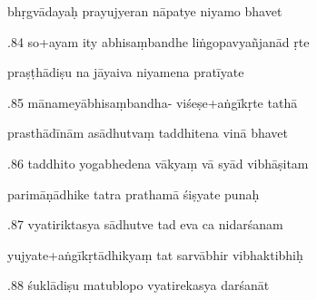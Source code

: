 \documentclass[article,12pt,a4paper]{memoir}%
\newcounter{parCount}
\begin{document}
	  
	  \pstart \leavevmode%
	bhṛgvādayaḥ prayujyeran nāpatye niyamo bhavet 
	{}
	\pend%
      

	  
	  \pstart {}.84 so+ayam ity abhisaṃbandhe liṅgopavyañjanād ṛte 
	{}
	\pend%
      

	  
	  \pstart \leavevmode%
	praṣṭhādiṣu na jāyaiva niyamena pratīyate 
	{}
	\pend%
      

	  
	  \pstart {}.85 mānameyābhisaṃbandha- viśeṣe+aṅgīkṛte tathā 
	{}
	\pend%
      

	  
	  \pstart \leavevmode%
	prasthādīnām asādhutvaṃ taddhitena vinā bhavet 
	{}
	\pend%
      

	  
	  \pstart {}.86 taddhito yogabhedena vākyaṃ vā syād vibhāṣitam 
	{}
	\pend%
      

	  
	  \pstart \leavevmode%
	parimāṇādhike tatra prathamā śiṣyate punaḥ 
	{}
	\pend%
      

	  
	  \pstart {}.87 vyatiriktasya sādhutve tad eva ca nidarśanam 
	{}
	\pend%
      

	  
	  \pstart \leavevmode%
	yujyate+aṅgīkṛtādhikyaṃ tat sarvābhir vibhaktibhiḥ 
	{}
	\pend%
      

	  
	  \pstart {}.88 śuklādiṣu matublopo vyatirekasya darśanāt 
	{}
	\pend%
      
\end{document}
